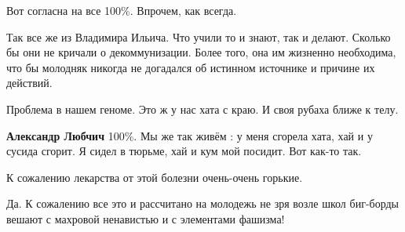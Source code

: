 \begin{itemize}
Вот согласна на все 100\%. Впрочем, как всегда.

 

Так все же из Владимира Ильича. Что учили то и знают, так и делают. Сколько бы
они не кричали о декоммунизации. Более того, она им жизненно необходима, что бы
молодняк никогда не догадался об истинном источнике и причине их действий.


 
Проблема в нашем геноме. Это ж у нас хата с краю. И своя рубаха ближе к телу.

\begin{itemize}
 
\textbf{Александр Любчич} 100\%. Мы же так живём : у меня сгорела хата, хай и у
сусида сгорит. Я сидел в тюрьме, хай и кум мой посидит. Вот как-то так.

 
К сожалению лекарства от этой болезни очень-очень горькие.
\end{itemize}

 
Да. К сожалению все это и рассчитано на молодежь не зря возле школ биг-борды
вешают с махровой ненавистью и с элементами фашизма!

 

\end{itemize}
